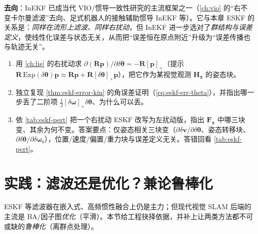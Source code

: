\begin{paper}
\textbf{去向}：InEKF 已成当代 VIO/惯导一致性研究的主流框架之一（\cref{ch:vio} 的“右不变卡尔曼滤波”去向、足式机器人的接触辅助惯导 InEKF 等）。它与本章 ESKF 的关系是：\emph{同样在流形上滤波、同样右扰动}，但 InEKF 进一步选对了\emph{群结构与误差定义}，使线性化误差与状态无关，从而把“误差恒在原点附近”升级为“误差传播也与轨迹无关”。
\end{paper}

\begin{practice}
\begin{enumerate}
  \item 用 \cref{ch:lie} 的右扰动求 $\partial(\mathbf{R}\mathbf{p})/\partial\delta\boldsymbol{\theta}=-\mathbf{R}[\mathbf{p}]_\times$（提示 $\mathbf{R}\,\mathrm{Exp}(\delta\boldsymbol{\theta})\mathbf{p}\approx\mathbf{R}\mathbf{p}+\mathbf{R}[\delta\boldsymbol{\theta}]_\times\mathbf{p}$），把它作为某视觉观测 $\mathbf{H}_{\mathbf{x}}$ 的姿态块。
  \item 独立复现 \cref{thm:eskf-error-kin} 的角误差证明（\cref{eq:eskf-err-theta}），并指出哪一步丢了二阶项 $\tfrac12[\delta\boldsymbol{\omega}]_\times\delta\boldsymbol{\theta}$、为什么可以丢。
  \item 依 \cref{tab:eskf-pert} 把一个右扰动 ESKF 改写为左扰动版，指出 $\mathbf{F}_{\mathbf{x}}$ 中哪三块变、其余为何不变。答案要点：仅姿态相关三块变（$\partial\delta\mathbf{v}/\partial\delta\boldsymbol{\theta}$、姿态转移块、$\partial\delta\boldsymbol{\theta}/\partial\delta\boldsymbol{\omega}_b$），位置/速度/偏置/重力块与误差定义无关。答错回看 \cref{tab:eskf-pert}。
\end{enumerate}
\end{practice}

\section{实践：滤波还是优化？兼论鲁棒化}
\label{sec:filter-vs-opt}

ESKF 等滤波器在嵌入式、高频惯性融合上仍是主力；但现代视觉 SLAM 后端的主流是 BA/因子图\emph{优化}（平滑）。本节给工程抉择依据，并补上让两类方法都不可或缺的\emph{鲁棒化}（离群点处理）。

